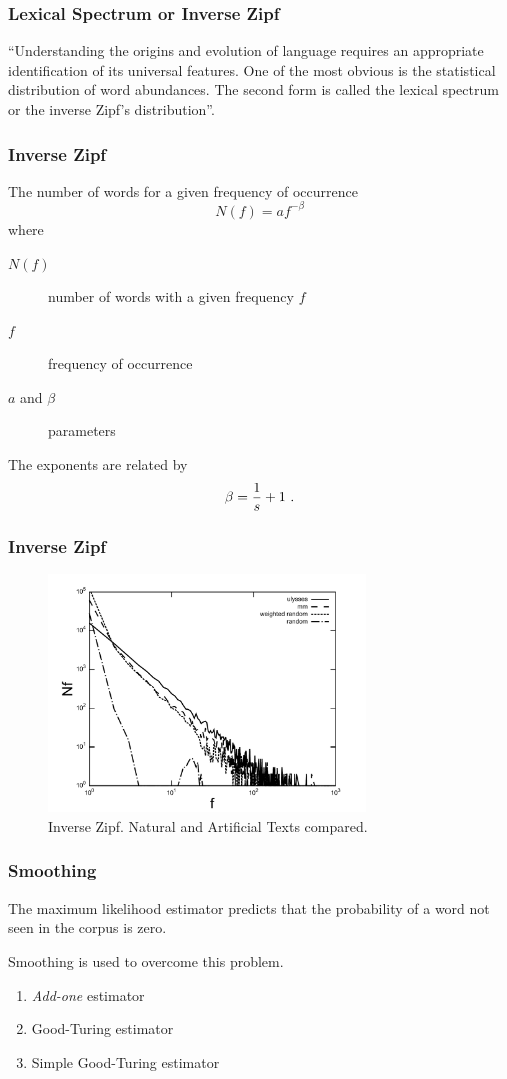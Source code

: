 \documentclass{beamer}
\begin{document}
\frame
{
  \frametitle{Lexical Spectrum or Inverse Zipf}
  ``Understanding the origins and evolution of language requires an appropriate
  identification of its universal features. One of the most obvious is the statistical 
  distribution of word abundances. The second
  form is called the lexical spectrum or the inverse Zipf’s distribution''\citep{cancho2002}.

}


\frame
{
  \frametitle{Inverse Zipf}
  
  The number of words for a given frequency of occurrence 
  \begin{equation}
  N(f) = a f^{-\beta}
  \end{equation}
  where 
  \begin{description}
  \item[$N(f)$] number of words with a given frequency $f$
  \item[$f$] frequency of occurrence 
  \item[$a$ and $\beta$] parameters
  \end{description}  


  The exponents are related by
  \begin{equation}
  \beta = \frac{1}{s} + 1 \textmd{ .}
  \end{equation}
}


\frame
{
  \frametitle{Inverse Zipf}
  \begin{figure}[h!]
  \centering
  \includegraphics[width=0.75\textwidth]{images/inverse_zipf_ulysses_words.pdf}
  \caption{Inverse Zipf. Natural and Artificial Texts compared.}
  \label{fig:inverse_zipf_ulysses_words}
  \end{figure} 
}


\frame
{
  \frametitle{Smoothing}
  The maximum likelihood estimator predicts that the probability of a word not seen in the
  corpus is zero.

  \vspace{0.3cm}
  Smoothing is used to overcome this problem.
  \begin{enumerate}
  \item \emph{Add-one} estimator \citep{laplace}
  \item Good-Turing estimator \citep{Good1953}
  \item Simple Good-Turing estimator \citep{galesampson95}
  \end{enumerate}
}
\end{document}

